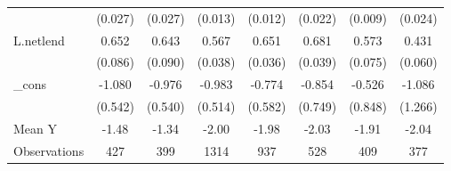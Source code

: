 {\begin{tabular}{l*{7}{c}}
            &     (0.027)         &     (0.027)         &     (0.013)         &     (0.012)         &     (0.022)         &     (0.009)         &     (0.024)         \\
\addlinespace
L.netlend   &       0.652\sym{***}&       0.643\sym{***}&       0.567\sym{***}&       0.651\sym{***}&       0.681\sym{***}&       0.573\sym{***}&       0.431\sym{***}\\
            &     (0.086)         &     (0.090)         &     (0.038)         &     (0.036)         &     (0.039)         &     (0.075)         &     (0.060)         \\
\addlinespace
\_cons      &      -1.080\sym{*}  &      -0.976\sym{*}  &      -0.983\sym{*}  &      -0.774         &      -0.854         &      -0.526         &      -1.086         \\
            &     (0.542)         &     (0.540)         &     (0.514)         &     (0.582)         &     (0.749)         &     (0.848)         &     (1.266)         \\
\midrule
Mean Y      &       -1.48         &       -1.34         &       -2.00         &       -1.98         &       -2.03         &       -1.91         &       -2.04         \\
Observations&         427         &         399         &        1314         &         937         &         528         &         409         &         377         \\
\bottomrule
\end{tabular}
}
